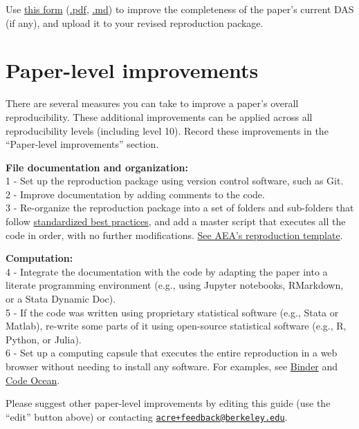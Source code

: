 \documentclass[
]{book}
\begin{document}
Use \href{sample-DAS.html}{this form} (\href{sample-DAS.pdf}{.pdf}, \href{https://github.com/BITSS/ACRE/blob/master/sample-DAS.md}{.md}) to improve the completeness of the paper's current DAS (if any), and upload it to your revised reproduction package.

\hypertarget{paper-level}{%
\section{Paper-level improvements}\label{paper-level}}

There are several measures you can take to improve a paper's overall reproducibility. These additional improvements can be applied across all reproducibility levels (including level 10). Record these improvements in the ``Paper-level improvements'' section.

\textbf{File documentation and organization: }\\
1 - Set up the reproduction package using version control software, such as Git.\\
2 - Improve documentation by adding comments to the code.\\
3 - Re-organize the reproduction package into a set of folders and sub-folders that follow \href{https://www.projecttier.org/tier-protocol/specifications/\#overview-of-the-documentation}{standardized best practices}, and add a master script that executes all the code in order, with no further modifications. \href{https://github.com/AEADataEditor/replication-template}{See AEA's reproduction template}.

\textbf{Computation:}\\
4 - Integrate the documentation with the code by adapting the paper into a literate programming environment (e.g., using Jupyter notebooks, RMarkdown, or a Stata Dynamic Doc).\\
5 - If the code was written using proprietary statistical software (e.g., Stata or Matlab), re-write some parts of it using open-source statistical software (e.g., R, Python, or Julia).\\
6 - Set up a computing capsule that executes the entire reproduction in a web browser without needing to install any software. For examples, see \href{https://mybinder.org/}{Binder} and \href{https://codeocean.com/}{Code Ocean}.

Please suggest other paper-level improvements by editing this guide (use the ``edit'' button above) or contacting \href{mailto:acre+feedback@berkeley.edu}{\nolinkurl{acre+feedback@berkeley.edu}}.
\end{document}

